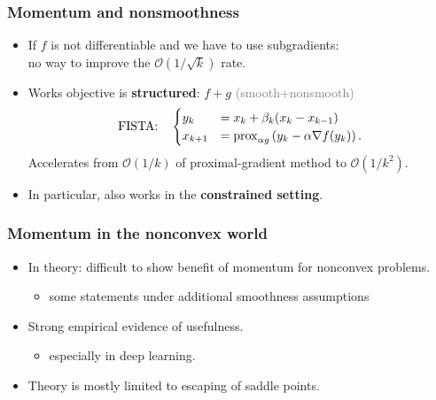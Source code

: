 \documentclass[aspectratio=149]{beamer}
\begin{document}
\begin{frame}
  \frametitle{Momentum and nonsmoothness}
  \begin{itemize}
    \item If $f$ is not differentiable and we have to use subgradients:\\
          no way to improve the $\mathcal{O}(1/\sqrt{k})$ rate.
    \item Works objective is \textbf{structured}: $f+g$ \textcolor{gray}{(smooth+nonsmooth)}
          \begin{equation}
            \text{FISTA:}\quad \begin{cases}
              y_{k} &= x_k + \beta_k (x_k - x_{k-1}) \\
              x_{k+1} &= \operatorname{prox}^{}_{\alpha g}\left(y_k - \alpha \nabla f(y_k) \right).
            \end{cases}
          \end{equation}
          Accelerates from $\mathcal{O}(1/k)$ of proximal-gradient method to $\mathcal{O}(1/k^2)$.
    \item In particular, also works in the \textbf{constrained setting}.
  \end{itemize}

\end{frame}


\begin{frame}
  \frametitle{Momentum in the nonconvex world}
  \begin{itemize}
    \item In theory: difficult to show benefit of momentum for nonconvex problems.
    \begin{itemize}
      \item some statements under additional smoothness assumptions
    \end{itemize}
    \item Strong empirical evidence of usefulness.
        \begin{itemize}
          \item especially in deep learning.
        \end{itemize}
    \item Theory is mostly limited to escaping of saddle points.
  \end{itemize}
\end{frame}
\end{document}
